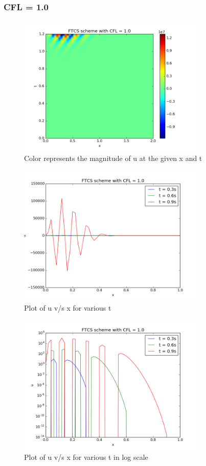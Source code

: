 \documentclass[11pt, a4paper]{article}
\begin{document}
\subsubsection{CFL = 1.0}
\begin{figure}[H]
 \centering
 \includegraphics[width = 0.8\textwidth]{FTCS1_1.png}
 \caption{Color represents the magnitude of u at the given x and t}
\end{figure}

\begin{figure}[H]
 \centering
 \includegraphics[width = 0.8\textwidth]{FTCS1_1_1.png}
 \caption{Plot of u v/s x for various t}
\end{figure}

\begin{figure}[H]
 \centering
 \includegraphics[width = 0.8\textwidth]{FTCS1_1_1_log.png}
 \caption{Plot of u v/s x for various t in log scale}
\end{figure}
\end{document}

